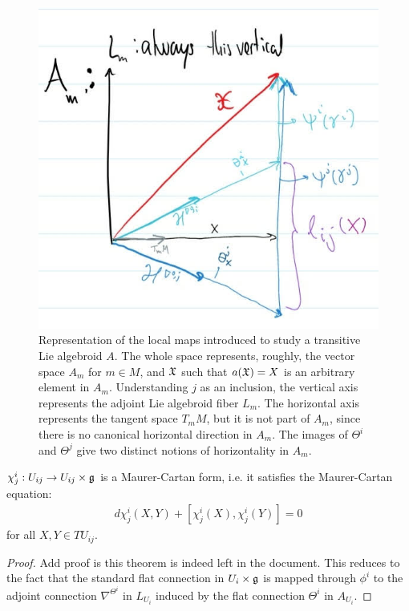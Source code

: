 \begin{figure}[t]
    \centering
    \includegraphics[width = \textwidth/2]{images/DiagramaMapasLocalesAlgebroide.jpg}
    \caption{Representation of the local maps introduced to study a transitive Lie algebroid $A$. The whole space represents, roughly, the vector space $A_m$ for $m \in M$, and $\mathfrak{X}$ such that $a(\mathfrak{X}) = X$ is an arbitrary element in $A_m$. Understanding $j$ as an inclusion, the vertical axis represents the adjoint Lie algebroid fiber $L_m$. The horizontal axis represents the tangent space $T_m M$, but it is not part of $A_m$, since there is no canonical horizontal direction in $A_m$. The images of $\Theta^i$ and $\Theta^j$ give two distinct notions of horizontality in $A_m$.}
    \label{fig:localMaps}
\end{figure}

\begin{theorem}
$\chi^i_j: U_{ij} \to U_{ij} \times \mathfrak{g}$ is a Maurer-Cartan form, i.e. it satisfies the Maurer-Cartan equation:
\begin{align*}
    d \chi^i_j(X, Y) + [\chi^i_j(X), \chi^i_j(Y)] = 0
\end{align*} for all $X, Y \in TU_{ij}$.
\end{theorem}

\begin{proof}
Add proof is this theorem is indeed left in the document. This reduces to the fact that the standard flat connection in $U_i \times \mathfrak{g}$ is mapped through $\phi^i$ to the adjoint connection $\nabla^{\Theta^i}$ in $L_{U_i}$ induced by the flat connection $\Theta^i$ in $A_{U_i}$. 
\end{proof}


